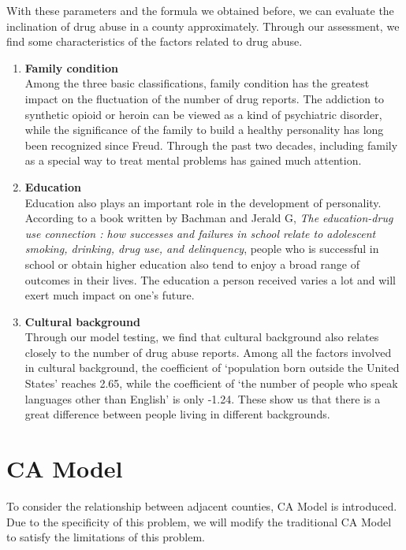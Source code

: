 \documentclass{mcmthesis}
\begin{document}
With these parameters and the formula we obtained before, we can evaluate the inclination of drug abuse in a county approximately. Through our assessment, we find some characteristics of the factors related to drug abuse. 
\begin{enumerate}[label=\alph*.]
\item \textbf{Family condition}\\ 
Among the three basic classifications, family condition has the greatest impact on the fluctuation of the number of drug reports. The addiction to synthetic opioid or heroin can be viewed as a kind of psychiatric disorder, while the significance of the family to build a healthy personality has long been recognized since Freud. Through the past two decades, including family as a special way to treat mental problems has gained much attention. 
\item  \textbf{Education}\\
  Education also plays an important role in the development of personality. According to a book written by Bachman and Jerald G, \emph{The education-drug use connection : how successes and failures in school relate to adolescent smoking, drinking, drug use, and delinquency}, people who is successful in school or obtain higher education also tend to enjoy a broad range of outcomes in their lives. The education a person received varies a lot and will exert much impact on one’s future.
\item  \textbf{Cultural background}\\
Through our model testing, we find that cultural background also relates closely to the number of drug abuse reports. Among all the factors involved in cultural background, the coefficient of ‘population born outside the United States’ reaches 2.65, while the coefficient of ‘the number of people who speak languages other than English’ is only -1.24. These show us that there is a great difference between people living in different backgrounds.
\end{enumerate}


\section{CA Model}

To consider the relationship between adjacent counties, CA Model is introduced. Due to the specificity of this problem, we will modify the traditional CA Model to satisfy the limitations of this problem. \par
\end{document}
